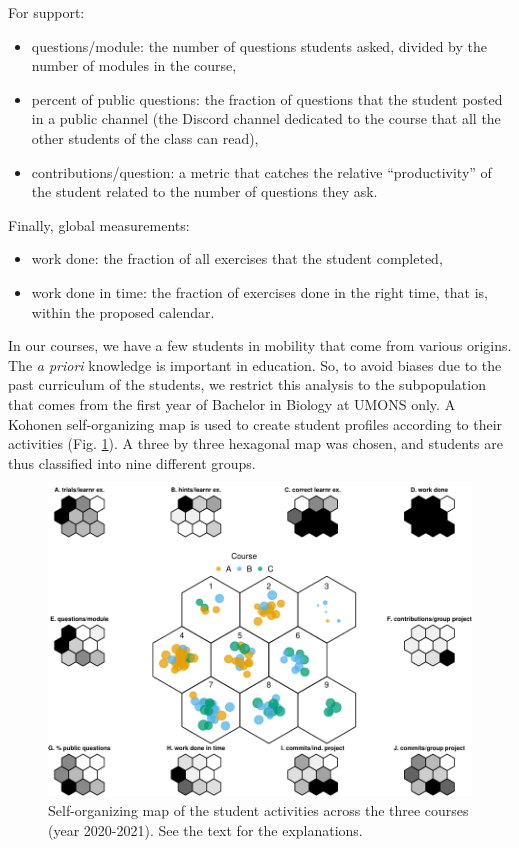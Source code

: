 \documentclass{aims}
\theoremstyle{definition}
\begin{document}
For support:

\begin{itemize}
\item
  questions/module: the number of questions students asked, divided by
  the number of modules in the course,
\item
  percent of public questions: the fraction of questions that the
  student posted in a public channel (the Discord channel dedicated to
  the course that all the other students of the class can read),
\item
  contributions/question: a metric that catches the relative
  ``productivity'' of the student related to the number of questions
  they ask.
\end{itemize}

Finally, global measurements:

\begin{itemize}
\item
  work done: the fraction of all exercises that the student completed,
\item
  work done in time: the fraction of exercises done in the right time,
  that is, within the proposed calendar.
\end{itemize}

In our courses, we have a few students in mobility that come from
various origins. The \emph{a priori} knowledge is important in
education. So, to avoid biases due to the past curriculum of the
students, we restrict this analysis to the subpopulation that comes from
the first year of Bachelor in Biology at UMONS only. A Kohonen
self-organizing map is used to create student profiles according to
their activities (Fig. \ref {fig:fig_som}). A three by three hexagonal
map was chosen, and students are thus classified into nine different
groups.

\begin{figure}
\includegraphics[width=1\linewidth]{teaching_data_science_files/figure-latex/fig_som-1} \caption{\label{fig:fig_som} Self-organizing map of the student activities across the three courses (year 2020-2021). See the text for the explanations.}\label{fig:fig_som}
\end{figure}
\end{document}
